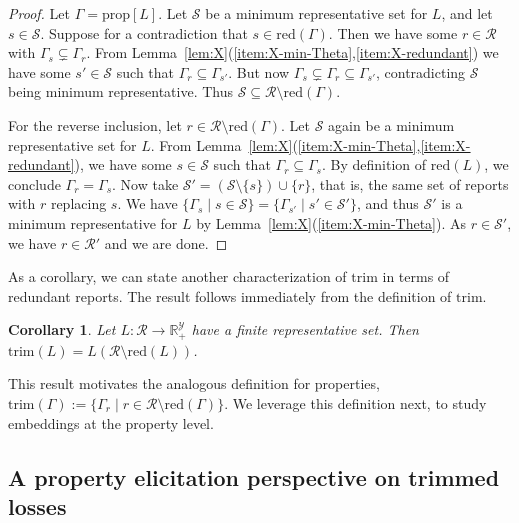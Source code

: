 \documentclass[11pt]{article}
\newcommand{\reals}{\mathbb{R}}
\newcommand{\prop}[1]{\mathrm{prop}[#1]}
\newcommand{\R}{\mathcal{R}}
\newcommand{\Sc}{\mathcal{S}}
\newcommand{\Y}{\mathcal{Y}}
\newcommand{\trim}{\mathrm{trim}}
\newcommand{\red}{\mathrm{red}}
\newcommand{\trimred}{\mathrm{trim}}
\newcommand{\trimcover}{\mathrm{trim}}
\newtheorem{corollary}{Corollary}
\begin{document}
\begin{proof}
  Let $\Gamma = \prop L$.
  Let $\Sc$ be a minimum representative set for $L$, and let $s\in\Sc$.
  Suppose for a contradiction that $s\in\red(\Gamma)$.
  Then we have some $r\in\R$ with $\Gamma_s \subsetneq \Gamma_r$.
  From Lemma~\ref{lem:X}(\ref{item:X-min-Theta},\ref{item:X-redundant}) we have some $s'\in\Sc$ such that $\Gamma_r \subseteq \Gamma_{s'}$.
  But now $\Gamma_s \subsetneq \Gamma_r \subseteq \Gamma_{s'}$, contradicting $\Sc$ being minimum representative.
  Thus $\Sc \subseteq \R \setminus \red(\Gamma)$.

  For the reverse inclusion, let $r\in\R\setminus\red(\Gamma)$.
  Let $\Sc$ again be a minimum representative set for $L$.
  From Lemma~\ref{lem:X}(\ref{item:X-min-Theta},\ref{item:X-redundant}), we have some $s\in\Sc$ such that $\Gamma_r \subseteq \Gamma_s$.
  By definition of $\red(L)$, we conclude $\Gamma_r = \Gamma_s$.
  Now take $\Sc' = (\Sc \setminus \{s\}) \cup \{r\}$, that is, the same set of reports with $r$ replacing $s$.
  We have $\{\Gamma_s \mid s\in\Sc\} = \{\Gamma_{s'} \mid s'\in\Sc'\}$, and thus $\Sc'$ is a minimum representative for $L$ by Lemma~\ref{lem:X}(\ref{item:X-min-Theta}).
  As $r\in\Sc'$, we have $r \in \R'$ and we are done.
\end{proof}


As a corollary, we can state another characterization of $\trim$ in terms of redundant reports.
The result follows immediately from the definition of $\trim$.

\begin{corollary}\label{cor:trim-loss-red}
  Let $L : \R \to \reals^\Y_+$ have a finite representative set.
  Then $\trimcover(L) = L(\R \setminus \red(L))$.
\end{corollary}

This result motivates the analogous definition for properties, $\trimred(\Gamma) := \{\Gamma_r \mid r \in \R\setminus\red(\Gamma)\}$.
We leverage this definition next, to study embeddings at the property level.

\subsection{A property elicitation perspective on trimmed losses}
\end{document}
